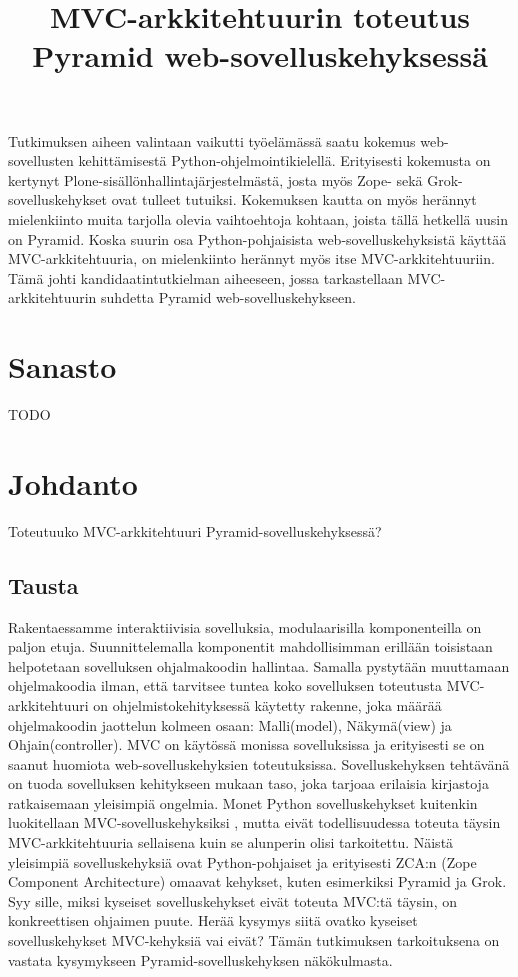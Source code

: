 \documentclass[finnish,utf8,nonumbib,palatino,kandi]{gradu2}
\title{MVC-arkkitehtuurin toteutus Pyramid web-sovelluskehyksessä}
\begin{document}
\preface

Tutkimuksen aiheen valintaan vaikutti työelämässä saatu
 kokemus web-sovellusten kehittämisestä Python-ohjelmointikielellä. Erityisesti
kokemusta on kertynyt Plone-sisällönhallintajärjestelmästä, josta myös Zope- sekä
Grok-sovelluskehykset ovat tulleet tutuiksi. Kokemuksen kautta on myös herännyt mielenkiinto
muita tarjolla olevia vaihtoehtoja kohtaan, joista tällä hetkellä uusin on Pyramid. Koska suurin osa Python-pohjaisista
web-sovelluskehyksistä käyttää MVC-arkkitehtuuria, on mielenkiinto herännyt myös itse MVC-arkkitehtuuriin. Tämä johti
kandidaatintutkielman aiheeseen, jossa tarkastellaan MVC-arkkitehtuurin suhdetta Pyramid web-sovelluskehykseen.

\mainmatter
\section{Sanasto}
TODO

\section{Johdanto}
Toteutuuko MVC-arkkitehtuuri Pyramid-sovelluskehyksessä?

\subsection{Tausta}
Rakentaessamme interaktiivisia sovelluksia, modulaarisilla komponenteilla on paljon etuja. Suunnittelemalla komponentit mahdollisimman erillään toisistaan helpotetaan
sovelluksen ohjalmakoodin hallintaa. Samalla pystytään muuttamaan ohjelmakoodia ilman, että tarvitsee tuntea koko sovelluksen toteutusta \cite[s.2]{Krasner:desc}
MVC-arkkitehtuuri on ohjelmistokehityksessä käytetty rakenne, joka määrää ohjelmakoodin jaottelun kolmeen osaan: Malli(model), Näkymä(view) ja Ohjain(controller). MVC on käytössä monissa sovelluksissa ja erityisesti se on saanut
huomiota web-sovelluskehyksien toteutuksissa. Sovelluskehyksen tehtävänä on tuoda sovelluksen kehitykseen mukaan
taso, joka tarjoaa erilaisia kirjastoja ratkaisemaan yleisimpiä ongelmia. Monet Python sovelluskehykset kuitenkin luokitellaan MVC-sovelluskehyksiksi \cite{mvcframeworks}, mutta eivät 
todellisuudessa toteuta täysin MVC-arkkitehtuuria sellaisena kuin se alunperin olisi tarkoitettu. Näistä yleisimpiä sovelluskehyksiä ovat Python-pohjaiset
ja erityisesti ZCA:n (Zope Component Architecture) omaavat kehykset, kuten esimerkiksi Pyramid ja Grok. Syy sille, miksi
kyseiset sovelluskehykset eivät toteuta MVC:tä täysin, on konkreettisen ohjaimen puute.
Herää kysymys siitä ovatko kyseiset sovelluskehykset MVC-kehyksiä vai eivät? Tämän tutkimuksen tarkoituksena on vastata kysymykseen Pyramid-sovelluskehyksen näkökulmasta.
\end{document}
